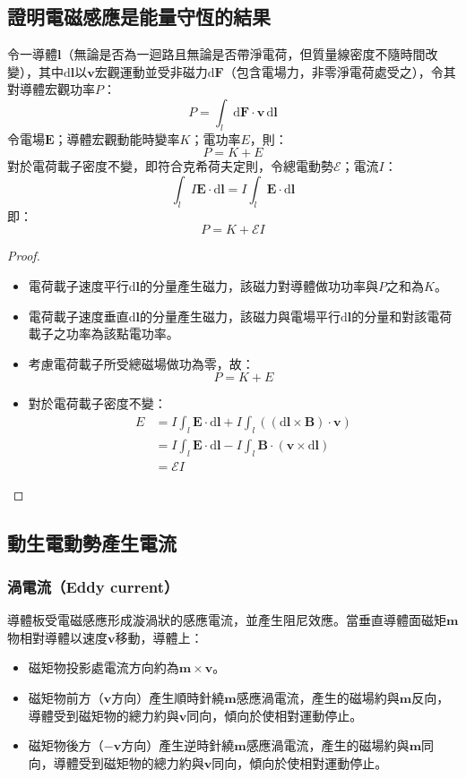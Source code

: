 \documentclass[a4paper,12pt]{report}
\begin{document}
\begin{itemize}
\subsection{證明電磁感應是能量守恆的結果}
令一導體$\mathbf{l}$（無論是否為一迴路且無論是否帶淨電荷，但質量線密度不隨時間改變），其中$\mathrm{d}\mathbf{l}$以$\mathbf{v}$宏觀運動並受非磁力$\mathrm{d}\mathbf{F}$（包含電場力，非零淨電荷處受之），令其對導體宏觀功率$P$：
\[P=\int_l\mathrm{d}\mathbf{F}\cdot\mathbf{v}\,\mathrm{d}\mathbf{l}\]
令電場$\mathbf{E}$；導體宏觀動能時變率$K$；電功率$E$，則：
\[P=K+E\]
對於電荷載子密度不變，即符合克希荷夫定則，令總電動勢$\mathcal{E}$；電流$I$：
\[\int_lI\mathbf{E}\cdot\mathrm{d}\mathbf{l}=I\int_l\mathbf{E}\cdot\mathrm{d}\mathbf{l}\]
即：
\[P=K+\mathcal{E}I\]
\begin{proof}\mbox{}\\
\begin{itemize}
\item 電荷載子速度平行$\mathrm{d}\mathbf{l}$的分量產生磁力，該磁力對導體做功功率與$P$之和為$K$。
\item 電荷載子速度垂直$\mathrm{d}\mathbf{l}$的分量產生磁力，該磁力與電場平行$\mathrm{d}\mathbf{l}$的分量和對該電荷載子之功率為該點電功率。
\item 考慮電荷載子所受總磁場做功為零，故：
\[P=K+E\]
\item 對於電荷載子密度不變：
\[\begin{aligned}
E&=I\int_l\mathbf{E}\cdot\mathrm{d}\mathbf{l}+I\int_l((\mathrm{d}\mathbf{l}\times\mathbf{B})\cdot\mathbf{v})\\
&=I\int_l\mathbf{E}\cdot\mathrm{d}\mathbf{l}-I\int_l\mathbf{B}\cdot(\mathbf{v}\times\mathrm{d}\mathbf{l})\\
&=\mathcal{E}I
\end{aligned}\]
\end{itemize}
\end{proof}
\subsection{動生電動勢產生電流}
\subsubsection{渦電流（Eddy current）}
導體板受電磁感應形成漩渦狀的感應電流，並產生阻尼效應。當垂直導體面磁矩$\mathbf{m}$物相對導體以速度$\mathbf{v}$移動，導體上：
\begin{itemize}
\item 磁矩物投影處電流方向約為$\mathbf{m}\times\mathbf{v}$。
\item 磁矩物前方（$\mathbf{v}$方向）產生順時針繞$\mathbf{m}$感應渦電流，產生的磁場約與$\mathbf{m}$反向，導體受到磁矩物的總力約與$\mathbf{v}$同向，傾向於使相對運動停止。
\item 磁矩物後方（$-\mathbf{v}$方向）產生逆時針繞$\mathbf{m}$感應渦電流，產生的磁場約與$\mathbf{m}$同向，導體受到磁矩物的總力約與$\mathbf{v}$同向，傾向於使相對運動停止。
\end{itemize}

\end{itemize}
\end{document}
